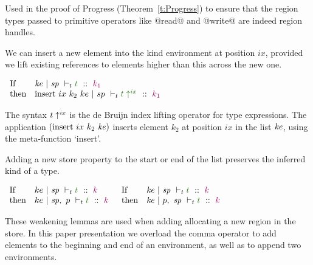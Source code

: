 \smallskip\noindent
Used in the proof of Progress (Theorem~\ref{t:Progress}) to ensure that the region types passed to primitive operators like @read@ and @write@ are indeed region handles.
\qqed


%
\begin{lemma}
We can insert a new element into the kind environment at position $ix$, provided we lift existing references to elements higher than this across the new one.
\end{lemma}
$
\begin{array}{ll}
        \pIf    & \KindT{\mke}{\msp}{t}{k_1}
\\      \pthen  & \KindT{\trm{insert}~ ix~ k_2~ ke}
                        {sp}
                        {\liftTT{ix}{t}}
                        {k_1}
\end{array}
$
\

\smallskip\noindent
The syntax $\liftTT{ix}{t}$ is the de Bruijn index lifting operator for type expressions. The application $(\trm{insert}~ ix~ k_2~ \mke)$ inserts element $k_2$ at position $ix$ in the list $\mke$, using the meta-function `insert'.
\qqed



\begin{lemma}
Adding a new store property to the start or end of the list preserves the inferred kind of a type.
\end{lemma}

\begin{center}
$
\begin{array}{ll}
        \pIf    & \KindT{ke}{\msp}{t}{k}
\\      \pthen  & \KindT{ke}{\msp,~ p}{t}{k}
\end{array}
$
\qq\qq
$
\begin{array}{ll}
        \pIf    & \KindT{\mke}{\msp}{t}{k}
\\      \pthen  & \KindT{\mke}{p,~ \msp}{t}{k}
\end{array}
$
\end{center}

\smallskip\noindent
These weakening lemmas are used when adding allocating a new region in the store. In this paper presentation we overload the comma operator to add elements to the beginning and end of an environment, as well as to append two environments.

\qqed

